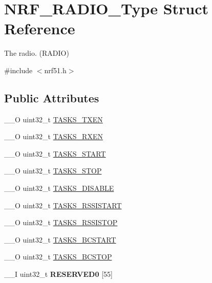 \hypertarget{struct_n_r_f___r_a_d_i_o___type}{}\section{N\+R\+F\+\_\+\+R\+A\+D\+I\+O\+\_\+\+Type Struct Reference}
\label{struct_n_r_f___r_a_d_i_o___type}


The radio. (R\+A\+D\+I\+O)  




{\ttfamily \#include $<$nrf51.\+h$>$}

\subsection*{Public Attributes}
\begin{DoxyCompactItemize}
\item 
\+\_\+\+\_\+\+O uint32\+\_\+t \hyperlink{struct_n_r_f___r_a_d_i_o___type_ab9a2ca4c894ab44d8f985b26b1f5b3e7}{T\+A\+S\+K\+S\+\_\+\+T\+X\+E\+N}
\item 
\+\_\+\+\_\+\+O uint32\+\_\+t \hyperlink{struct_n_r_f___r_a_d_i_o___type_aa0f1c2ce5bd44ef40317172b1fec1e34}{T\+A\+S\+K\+S\+\_\+\+R\+X\+E\+N}
\item 
\+\_\+\+\_\+\+O uint32\+\_\+t \hyperlink{struct_n_r_f___r_a_d_i_o___type_a1b9fd4ae0cfe8f5b4dd2883a5599ea77}{T\+A\+S\+K\+S\+\_\+\+S\+T\+A\+R\+T}
\item 
\+\_\+\+\_\+\+O uint32\+\_\+t \hyperlink{struct_n_r_f___r_a_d_i_o___type_a08b2ae3ada854834304b0984286681b5}{T\+A\+S\+K\+S\+\_\+\+S\+T\+O\+P}
\item 
\+\_\+\+\_\+\+O uint32\+\_\+t \hyperlink{struct_n_r_f___r_a_d_i_o___type_abca946301156da0fa63facb28541c0b2}{T\+A\+S\+K\+S\+\_\+\+D\+I\+S\+A\+B\+L\+E}
\item 
\+\_\+\+\_\+\+O uint32\+\_\+t \hyperlink{struct_n_r_f___r_a_d_i_o___type_abc49b74f6102e370927ba02182b85b1d}{T\+A\+S\+K\+S\+\_\+\+R\+S\+S\+I\+S\+T\+A\+R\+T}
\item 
\+\_\+\+\_\+\+O uint32\+\_\+t \hyperlink{struct_n_r_f___r_a_d_i_o___type_a8d5beb68055fbba65dcbb7f45a44335f}{T\+A\+S\+K\+S\+\_\+\+R\+S\+S\+I\+S\+T\+O\+P}
\item 
\+\_\+\+\_\+\+O uint32\+\_\+t \hyperlink{struct_n_r_f___r_a_d_i_o___type_a494e4902f09a38758844a14650ad1bad}{T\+A\+S\+K\+S\+\_\+\+B\+C\+S\+T\+A\+R\+T}
\item 
\+\_\+\+\_\+\+O uint32\+\_\+t \hyperlink{struct_n_r_f___r_a_d_i_o___type_aa512858912095297c59c7905c83694f9}{T\+A\+S\+K\+S\+\_\+\+B\+C\+S\+T\+O\+P}
\item 
\hypertarget{struct_n_r_f___r_a_d_i_o___type_aefd395942f8e0bc890e60bc63be18e7b}{}\+\_\+\+\_\+\+I uint32\+\_\+t {\bfseries R\+E\+S\+E\+R\+V\+E\+D0} \mbox{[}55\mbox{]}\label{struct_n_r_f___r_a_d_i_o___type_aefd395942f8e0bc890e60bc63be18e7b}


\end{DoxyCompactItemize}
